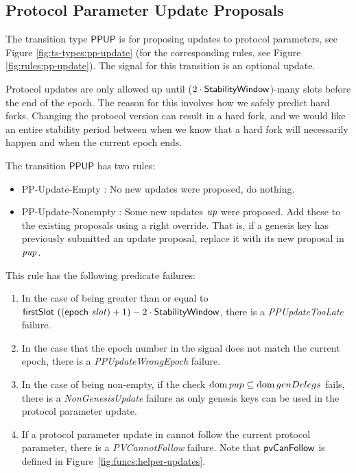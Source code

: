 \subsection{Protocol Parameter Update Proposals}
\label{sec:pp-proposals}

The transition type $\mathsf{PPUP}$ is for proposing updates to protocol
parameters, see Figure \ref{fig:ts-types:pp-update} (for the corresponding rules,
see Figure \ref{fig:rules:pp-update}).
The signal for this transition is an optional update.

Protocol updates are only allowed up until ($2\cdot\mathsf{StabilityWindow}$)-many slots before the
end of the epoch. The reason for this involves how we safely predict hard forks.
Changing the protocol version can result in a hard fork, and we would like an
entire stability period between when we know that a hard fork will necessarily happen
and when the current epoch ends.

The transition $\mathsf{PPUP}$ has two rules:
\begin{itemize}
  \item PP-Update-Empty : No new updates were proposed, do nothing.
  \item PP-Update-Nonempty : Some new updates $\mathit{up}$ were proposed.
  Add these to the existing proposals using a right override. That is, if a genesis key
  has previously submitted an update proposal, replace it with its new
  proposal in $\mathit{pup}$.
\end{itemize}

This rule has the following predicate failures:

\begin{enumerate}
\item In the case of  being greater than or equal to
  $\mathsf{firstSlot}~((\mathsf{epoch}~\mathit{slot}) + 1) - 2\cdot\mathsf{StabilityWindow}$, there is
  a \emph{PPUpdateTooLate} failure.
\item In the case that the epoch number in the signal does not match the current epoch,
  there is a \emph{PPUpdateWrongEpoch} failure.
\item In the case of  being non-empty, if the check $\operatorname{dom} pup \subseteq
  \operatorname{dom} genDelegs$ fails, there is a \emph{NonGenesisUpdate} failure as only genesis keys
  can be used in the protocol parameter update.
\item If a protocol parameter update in  cannot follow the current
  protocol parameter, there is a \emph{PVCannotFollow} failure.
  Note that $\mathsf{pvCanFollow}$ is defined in Figure~\ref{fig:funcs:helper-updates}.
\end{enumerate}

